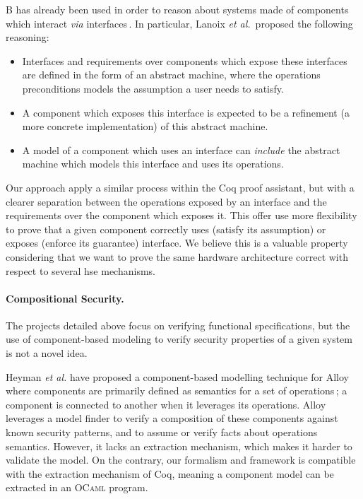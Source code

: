 B has already been used in order to reason about systems made of components
which interact \emph{via}
interfaces\,\cite{souquieres2005verifying,chouali2006proving,lanoix:hal-00105041}.
%
In particular, Lanoix \emph{et al.}\,\cite{lanoix:hal-00105041} proposed the
following reasoning:
%
\begin{itemize}
\item Interfaces and requirements over components which expose these interfaces
  are defined in the form of an abstract machine, where the operations
  preconditions models the assumption a user needs to satisfy.
\item A component which exposes this interface is expected to be a refinement (a
  more concrete implementation) of this abstract machine.
\item A model of a component which uses an interface can \emph{include} the
  abstract machine which models this interface and uses its operations.
\end{itemize}
%
Our approach apply a similar process within the Coq proof assistant, but with a
clearer separation between the operations exposed by an interface and the
requirements over the component which exposes it.
%
This offer use more flexibility to prove that a given component correctly uses
(satisfy its assumption) or exposes (enforce its guarantee) interface.
%
We believe this is a valuable property considering that we want to prove the
same hardware architecture correct with respect to several \ac{hse} mechanisms.

\paragraph{Compositional Security.}

The projects detailed above focus on verifying functional specifications, but
the use of component-based modeling to verify security properties of a given
system is not a novel idea.

Heyman \emph{et al.} have proposed a component-based modelling technique for
Alloy\,\cite{jackson2012alloy} where components are primarily defined as
semantics for a set of operations\,\cite{heyman2012securemodel}; a component is
connected to another when it leverages its operations.
%
Alloy leverages a model finder to verify a composition of these components
against known security patterns, and to assume or verify facts about operations
semantics.
%
However, it lacks an extraction mechanism, which makes it harder to validate the
model.
%
On the contrary, our formalism and framework is compatible with the extraction
mechanism of Coq, meaning a component model can be extracted in an {\scshape
  OCaml} program.

